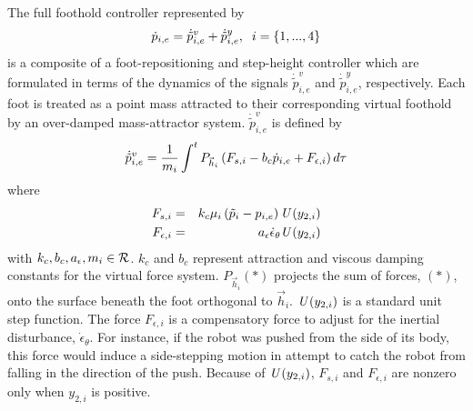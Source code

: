 		The full foothold controller represented by 
			\begin{equation}
				\dot{p}_{i,e} = \dot{\tilde{p}}_{i,e}^{v} + \dot{\tilde{p}}_{i,e}^{y}, \hspace{2mm} i = \{1,...,4\}
			\end{equation} 
		is a composite of a foot-repositioning and step-height controller which are formulated in terms of the dynamics of the signals $\dot{\tilde{p}}_{i,e}^{v}$ and $\dot{\tilde{p}}_{i,e}^{y}$, respectively. Each foot is treated as a point mass attracted to their corresponding virtual foothold by an over-damped mass-attractor system. $\dot{\tilde{p}}_{i,e}^{v}$ is defined by
			\begin{equation}
				\dot{\tilde{p}}_{i,e}^{v} 		= \frac{1}{m_{i}} \int^t{{P}_{\vec{h}_{i}} \left( F_{s,i}  -b_{c} \dot{p}_{i,e} + F_{\epsilon,i} \right) d\tau}
				\label{eq::foot_place_control}
			\end{equation}
		where
			\begin{eqnarray*}
				F_{s,i} 			& = & k_{c}  \mu_{i} \left( \tilde{p}_{i} - {p}_{i,e} \right) \emph{U}\left(y_{2,i}\right)		\nonumber\\
				F_{\epsilon,i}		& = & a_{\epsilon}\dot{\epsilon}_{\theta} \emph{U}\left(y_{2,i}\right)						\nonumber
			\end{eqnarray*}
	 	with $k_{c},b_{c},a_{\epsilon},m_{i} \in {\cal R}$.
		$k_{c}$ and $b_{c}$ represent  attraction and viscous damping constants for the virtual force system. ${P}_{\vec{h}_{i}}(*)$ projects the sum of  forces, $(*)$, onto the surface beneath the \Ith foot orthogonal to $\vec{h}_{i}$. $\emph{U}\left(y_{2,i}\right)$ is a standard unit step function. The force $F_{\epsilon,i}$ is a compensatory force to adjust for the inertial disturbance,  $\dot{\epsilon}_{\theta}$. For instance, if the robot was pushed from the side of its body, this force would induce a side-stepping motion in attempt to catch the robot from falling in the direction of the push. Because of $\emph{U}\left(y_{2,i}\right)$, $F_{s,i}$ and $F_{\epsilon,i}$ are nonzero only when $y_{2,i}$ is positive.

